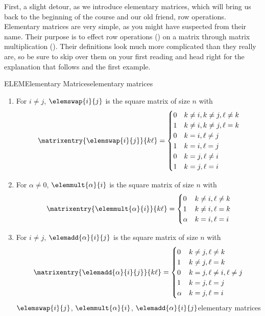 %
First, a slight detour, as we introduce elementary matrices, which will bring us back to the beginning of the course and our old friend, row operations.
%
%
Elementary matrices are very simple, as you might have suspected from their name.  Their purpose is to effect row operations () on a matrix through matrix multiplication ().  Their definitions look much more complicated than they really are, so be sure to skip over them on your first reading and head right for the explanation that follows and the first example.
%
\begin{definition}{ELEM}{Elementary Matrices}{elementary matrices}
\begin{enumerate}
\item For $i\neq j$, $\elemswap{i}{j}$ is the square matrix of size $n$ with
%
\begin{equation*}
\matrixentry{\elemswap{i}{j}}{k\ell}=
\begin{cases}
0 & k\neq i, k\neq j, \ell\neq k\\
1 & k\neq i, k\neq j, \ell=k\\
0 & k=i, \ell\neq j\\
1 & k=i, \ell=j\\
0 & k=j, \ell\neq i\\
1 & k=j, \ell=i
\end{cases}
\end{equation*}
%
\item For $\alpha\neq 0$, $\elemmult{\alpha}{i}$ is the square matrix of size $n$ with
%
\begin{equation*}
\matrixentry{\elemmult{\alpha}{i}}{k\ell}=
\begin{cases}
0        & k\neq i, \ell\neq k\\
1        & k\neq i, \ell=k\\
\alpha & k=i, \ell=i
\end{cases}
\end{equation*}
%
\item For $i\neq j$, $\elemadd{\alpha}{i}{j}$ is the square matrix of size $n$ with
%
\begin{equation*}
\matrixentry{\elemadd{\alpha}{i}{j}}{k\ell}=
\begin{cases}
0 & k\neq j, \ell\neq k\\
1 & k\neq j, \ell=k\\
0 & k=j, \ell\neq i, \ell\neq j\\
1 & k=j, \ell=j\\
\alpha & k=j, \ell=i\\
\end{cases}
\end{equation*}
%
{$\elemswap{i}{j}$, $\elemmult{\alpha}{i}$, $\elemadd{\alpha}{i}{j}$}{elementary matrices}
\end{enumerate}
\end{definition}
